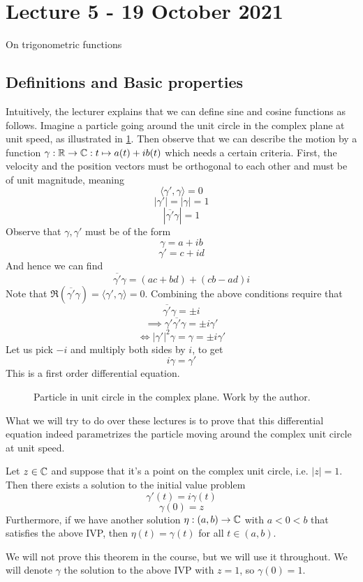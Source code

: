 \section{Lecture 5 - 19 October 2021}
On trigonometric functions
\subsection{Definitions and Basic properties}
Intuitively, the lecturer explains that we can define sine and cosine functions as
follows. Imagine a particle going around the unit circle in the complex plane at unit
speed, as illustrated in \ref{fig:unit-circle-complex}. Then observe that we can describe
the motion by a function $\gamma:\mathbb R\to\mathbb C:t\mapsto a(t)+ib(t)$ which needs a certain
criteria. First, the velocity and the position vectors must be orthogonal to each other
and must be of unit magnitude, meaning 
\[\langle \gamma',\gamma \rangle =0\]
\[|\gamma'|=|\gamma|=1\]
\[|\overline{\gamma'}\gamma|=1\]
Observe that $\gamma, \gamma'$ must be of the form
\[\gamma= a+ib\]
\[\gamma'= c+id\]
And hence we can find
\[\overline{\gamma'}\gamma= (ac+bd) + (cb-ad)i\]
Note that $\Re (\overline{\gamma'}\gamma)=\langle \gamma',\gamma\rangle =0$. Combining the
above conditions require that 
\[\overline{\gamma'}\gamma =\pm i\]
\[\implies \gamma'\overline{\gamma'}\gamma = \pm i \gamma'\]
\[\iff |\gamma'|^2\gamma=\gamma=\pm i \gamma'\]
Let us pick $-i$ and multiply both sides by $i$, to get 
\[i\gamma = \gamma'\]
This is a first order differential equation.
\begin{figure}[ht]
    \centering
    \caption{Particle in unit circle in the complex plane. Work by the author.}
    \label{fig:unit-circle-complex}
\end{figure}

What we will try to do over these lectures is to prove that this differential equation
indeed parametrizes the particle moving around the complex unit circle at unit speed.

\begin{theorem}
    Let $z\in\mathbb C$ and suppose that it's a point on the complex unit circle, i.e. $|z|=1$.
    Then there exists a solution to the initial value problem 
    \[\gamma'(t)=i\gamma(t)\]
    \[\gamma(0)=z\]
    Furthermore, if we have another solution $\eta:(a,b)\to\mathbb C$ with $a<0<b$ that
    satisfies the above IVP, then $\eta(t)=\gamma(t)$ for all $t\in(a,b)$.
    \label{thm:the-unnamed}
\end{theorem}
We will not prove this theorem in the course, but we will use it throughout. We will
denote $\gamma$ the solution to the above IVP with $z=1$, so $\gamma(0)=1$.

